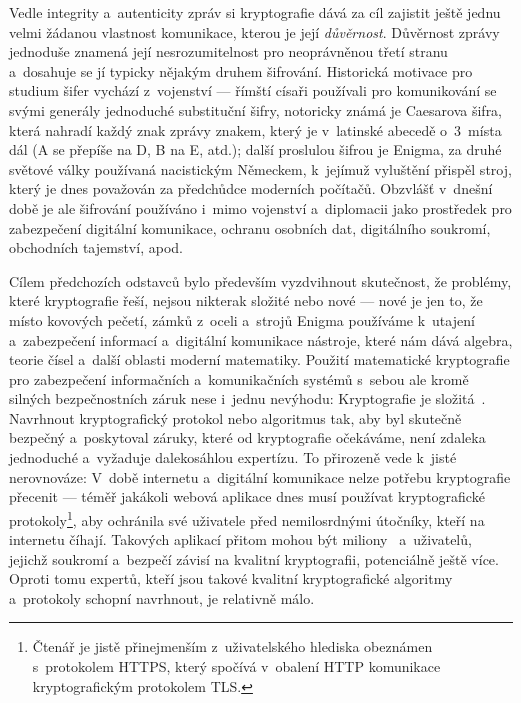 Vedle integrity a~autenticity zpráv si kryptografie dává za cíl zajistit ještě jednu velmi žádanou vlastnost komunikace, kterou je její \emph{důvěrnost}. Důvěrnost zprávy jednoduše znamená její nesrozumitelnost pro neoprávněnou třetí stranu a~dosahuje se jí typicky nějakým druhem šifrování. Historická motivace pro studium šifer vychází z~vojenství --- římští císaři používali pro komunikování se svými generály jednoduché substituční šifry, notoricky známá je Caesarova šifra, která nahradí každý znak zprávy znakem, který je v~latinské abecedě o~3~místa dál (A se přepíše na D, B na E, atd.); další proslulou šifrou je Enigma, za druhé světové války používaná nacistickým Německem, k~jejímuž vyluštění přispěl stroj, který je dnes považován za předchůdce moderních počítačů. Obzvlášť v~dnešní době je ale šifrování používáno i~mimo vojenství a~diplomacii jako prostředek pro zabezpečení digitální komunikace, ochranu osobních dat, digitálního soukromí, obchodních tajemství, apod. \cite{kahn1996codebreakers}

Cílem předchozích odstavců bylo především vyzdvihnout skutečnost, že problémy, které kryptografie řeší, nejsou nikterak složité nebo nové --- nové je jen to, že místo kovových pečetí, zámků z~oceli a~strojů Enigma používáme k~utajení a~zabezpečení informací a~digitální komunikace nástroje, které nám dává algebra, teorie čísel a~další oblasti moderní matematiky. Použití matematické kryptografie pro zabezpečení informačních a~komunikačních systémů s~sebou ale kromě silných bezpečnostních záruk nese i~jednu nevýhodu: Kryptografie je složitá~\cite{youreallyshouldnt, hurdles}. Navrhnout kryptografický protokol nebo algoritmus tak, aby byl skutečně bezpečný a~poskytoval záruky, které od kryptografie očekáváme, není zdaleka jednoduché a~vyžaduje dalekosáhlou expertízu. To přirozeně vede k~jisté nerovnováze: V~době internetu a~digitální komunikace nelze potřebu kryptografie přecenit --- téměř jakákoli webová aplikace dnes musí používat kryptografické protokoly\footnote{Čtenář je jistě přinejmenším z~uživatelského hlediska obeznámen s~protokolem HTTPS, který spočívá v~obalení HTTP komunikace kryptografickým protokolem TLS.}, aby ochránila své uživatele před nemilosrdnými útočníky, kteří na internetu číhají. Takových aplikací přitom mohou být miliony~\cite{appstorestats} a~uživatelů, jejichž soukromí a~bezpečí závisí na kvalitní kryptografii, potenciálně ještě více. Oproti tomu expertů, kteří jsou takové kvalitní kryptografické algoritmy a~protokoly schopní navrhnout, je relativně málo.

